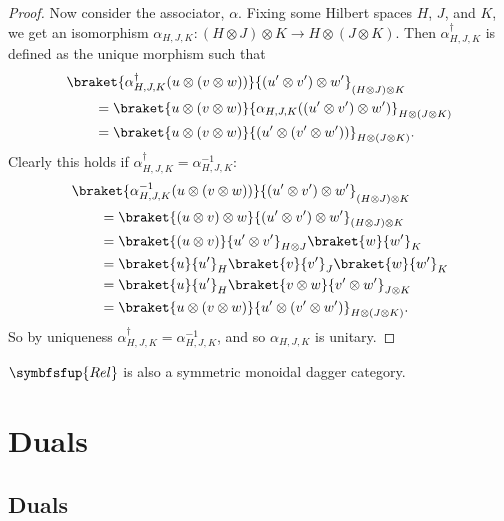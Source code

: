 \documentclass[fleqn]{NotesClass}
\makeatletter
\newcommand{\c@egory}[1]{\symbfsfup{#1}}
\newcommand{\Rel}{\c@egory{Rel}}
\makeatother
\begin{document}
\begin{lma}{}{}
\begin{proof}
            Now consider the associator, \(\alpha\).
            Fixing some Hilbert spaces \(H\), \(J\), and \(K\), we get an isomorphism \(\alpha_{H,J,K} \colon (H \otimes J) \otimes K \to H \otimes (J \otimes K)\).
            Then \(\alpha_{H,J,K}^\dagger\) is defined as the unique morphism such that
            \begin{align}
                &\braket{\alpha_{H,J,K}^\dagger(u \otimes (v \otimes w))}{(u' \otimes v') \otimes w'}_{(H\otimes J)\otimes K}\\
                &\qquad= \braket{u \otimes (v \otimes w)}{\alpha_{H,J,K}((u' \otimes v') \otimes w')}_{H\otimes(J\otimes K)}\\
                &\qquad= \braket{u \otimes (v \otimes w)}{(u' \otimes (v' \otimes w'))}_{H\otimes(J\otimes K)}.
            \end{align}
            Clearly this holds if \(\alpha_{H,J,K}^\dagger = \alpha_{H,J,K}^{-1}\):
            \begin{align}
                &\braket{\alpha_{H,J,K}^{-1}(u \otimes (v \otimes w))}{(u' \otimes v') \otimes w'}_{(H\otimes J)\otimes K}\\
                &\qquad= \braket{(u \otimes v) \otimes w}{(u' \otimes v') \otimes w'}_{(H\otimes J)\otimes K}\\
                &\qquad= \braket{(u \otimes v)}{u' \otimes v'}_{H\otimes J}\braket{w}{w'}_K\\
                &\qquad= \braket{u}{u'}_H \braket{v}{v'}_J \braket{w}{w'}_K\\
                &\qquad= \braket{u}{u'}_{H} \braket{v \otimes w}{v' \otimes w'}_{J \otimes K}\\
                &\qquad= \braket{u \otimes (v \otimes w)}{u' \otimes (v' \otimes w')}_{H\otimes(J\otimes K)}.
            \end{align}
            So by uniqueness \(\alpha_{H,J,K}^\dagger = \alpha_{H,J,K}^{-1}\), and so \(\alpha_{H,J,K}\) is unitary.
        \end{proof}
    \end{lma}
    
    \(\Rel\) is also a symmetric monoidal dagger category.
    
    \part{Duals}
    \chapter{Duals}
\end{document}
